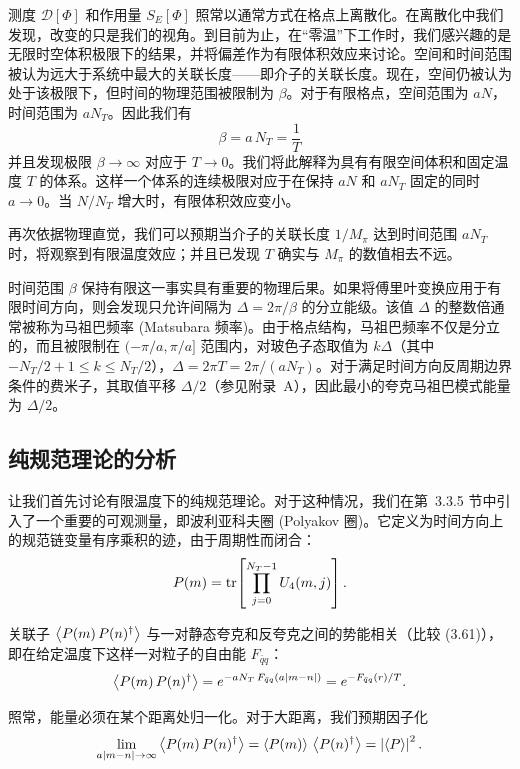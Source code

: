 测度 $\mathcal{D}[\Phi]$ 和作用量 $S_E[\Phi]$ 照常以通常方式在格点上离散化。在离散化中我们发现，改变的只是我们的视角。到目前为止，在“零温”下工作时，我们感兴趣的是无限时空体积极限下的结果，并将偏差作为有限体积效应来讨论。空间和时间范围被认为远大于系统中最大的关联长度——即介子的关联长度。现在，空间仍被认为处于该极限下，但时间的物理范围被限制为 $\beta$。对于有限格点，空间范围为 $aN$，时间范围为 $aN_T$。因此我们有
\begin{equation}
  \beta = a\,N_T = \frac{1}{T}
\end{equation}
并且发现极限 $\beta\to\infty$ 对应于 $T\to 0$。我们将此解释为具有有限空间体积和固定温度 $T$ 的体系。这样一个体系的连续极限对应于在保持 $aN$ 和 $aN_T$ 固定的同时 $a\to 0$。当 $N/N_T$ 增大时，有限体积效应变小。

再次依据物理直觉，我们可以预期当介子的关联长度 $1/M_\pi$ 达到时间范围 $aN_T$ 时，将观察到有限温度效应；并且已发现 $T$ 确实与 $M_\pi$ 的数值相去不远。

时间范围 $\beta$ 保持有限这一事实具有重要的物理后果。如果将傅里叶变换应用于有限时间方向，则会发现只允许间隔为 $\Delta = 2\pi/\beta$ 的分立能级。该值 $\Delta$ 的整数倍通常被称为马祖巴频率 (Matsubara 频率)。由于格点结构，马祖巴频率不仅是分立的，而且被限制在 $(-\pi/a,\pi/a]$ 范围内，对玻色子态取值为 $k\Delta$（其中 $-N_T/2 + 1 \le k \le N_T/2$），$\Delta = 2\pi T = 2\pi/(aN_T)$。对于满足时间方向反周期边界条件的费米子，其取值平移 $\Delta/2$（参见附录~A），因此最小的夸克马祖巴模式能量为 $\Delta/2$。

\subsection{纯规范理论的分析}

让我们首先讨论有限温度下的纯规范理论。对于这种情况，我们在第~3.3.5 节中引入了一个重要的可观测量，即波利亚科夫圈 (Polyakov 圈)。它定义为时间方向上的规范链变量有序乘积的迹，由于周期性而闭合：
\begin{equation}
  P(m) = \operatorname{tr}\!\left[\prod_{j=0}^{N_T-1} U_4(m,j)\right].
\end{equation}

关联子 $\left\langle P(m)\,P(n)^\dagger \right\rangle$ 与一对静态夸克和反夸克之间的势能相关（比较 (3.61)），即在给定温度下这样一对粒子的自由能 $F_{\bar{q}q}$：
\begin{equation}
  \left\langle P(m)\,P(n)^\dagger \right\rangle = e^{-a N_T\,F_{\bar{q}q}(a|m-n|)}
    = e^{-F_{\bar{q}q}(r)/T}.
\end{equation}

照常，能量必须在某个距离处归一化。对于大距离，我们预期因子化
\begin{equation}
  \lim_{a|m-n|\to\infty} \left\langle P(m)\,P(n)^\dagger \right\rangle
    = \left\langle P(m) \right\rangle\,\left\langle P(n)^\dagger \right\rangle = \left|\left\langle P \right\rangle\right|^2.
\end{equation}

